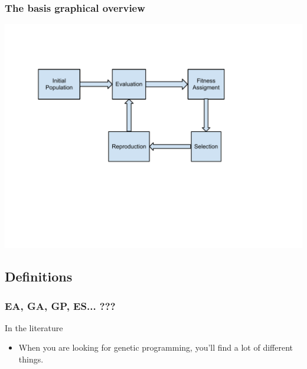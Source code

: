 \begin{frame}
  \frametitle{The basis graphical overview}
  \begin{center}
    \includegraphics[scale=0.5]{img/cycle}
  \end{center}
\end{frame}

\subsection{Definitions}

\begin{frame}
  \frametitle{EA, GA, GP, ES... ???}
  \begin{block}{In the literature}
    \begin{itemize}[<+->]
    \item When you are looking for genetic programming, you'll find a
      lot of different things.
    \end{itemize}
  \end{block}
\end{frame}
